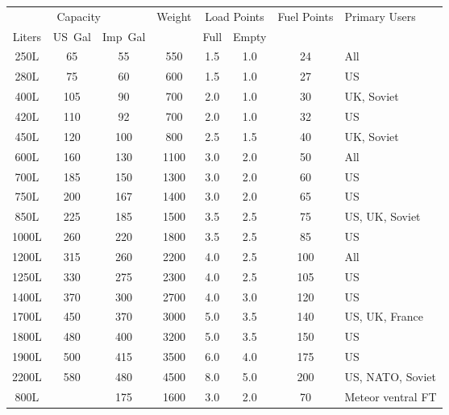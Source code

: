 \begin{twocolumntablefloat}
\begin{twocolumntable}
{
\begin{tabular}{cccccccl}
\toprule
\multicolumn{3}{c}{Capacity}&
Weight&
\multicolumn{2}{c}{Load Points}&
Fuel Points&
Primary Users\\
\cmidrule{1-3}
\cmidrule{5-6}
Liters&US~Gal&Imp~Gal&&Full&Empty&&\\
\midrule
\phantom{0}250L&\phantom{0}65&\phantom{0}55&\phantom{0}550&1.5&1.0&\phantom{0}24&All\\
\phantom{0}280L&\phantom{0}75&\phantom{0}60&\phantom{0}600&1.5&1.0&\phantom{0}27&US\\
\phantom{0}400L&\phantom{}105&\phantom{0}90&\phantom{0}700&2.0&1.0&\phantom{0}30&UK, Soviet\\
\phantom{0}420L&\phantom{}110&\phantom{0}92&\phantom{0}700&2.0&1.0&\phantom{0}32&US\\
\phantom{0}450L&\phantom{}120&\phantom{}100&\phantom{0}800&2.5&1.5&\phantom{0}40&UK, Soviet\\
\phantom{0}600L&\phantom{}160&\phantom{0}130&\phantom{}1100&3.0&2.0&\phantom{0}50&All\\
\phantom{0}700L&\phantom{}185&\phantom{0}150&\phantom{}1300&3.0&2.0&\phantom{0}60&US\\
\phantom{0}750L&\phantom{}200&\phantom{0}167&\phantom{}1400&3.0&2.0&\phantom{0}65&US\\
\phantom{0}850L&\phantom{}225&\phantom{0}185&\phantom{}1500&3.5&2.5&\phantom{0}75&US, UK, Soviet\\
\phantom{}1000L&\phantom{}260&\phantom{0}220&\phantom{}1800&3.5&2.5&\phantom{0}85&US\\
\phantom{}1200L&\phantom{}315&\phantom{0}260&\phantom{}2200&4.0&2.5&\phantom{}100&All\\
\phantom{}1250L&\phantom{}330&\phantom{0}275&\phantom{}2300&4.0&2.5&\phantom{}105&US\\
\phantom{}1400L&\phantom{}370&\phantom{0}300&\phantom{}2700&4.0&3.0&\phantom{}120&US\\
\phantom{}1700L&\phantom{}450&\phantom{0}370&\phantom{}3000&5.0&3.5&\phantom{}140&US, UK, France\\
\phantom{}1800L&\phantom{}480&\phantom{0}400&\phantom{}3200&5.0&3.5&\phantom{}150&US\\
\phantom{}1900L&\phantom{}500&\phantom{0}415&\phantom{}3500&6.0&4.0&\phantom{}175&US\\
\phantom{}2200L&\phantom{}580&\phantom{0}480&\phantom{}4500&8.0&5.0&\phantom{}200&US, NATO, Soviet\\
\midrule
\phantom{0}800L&\phantom{}&\phantom{0}175&\phantom{}1600&3.0&2.0&\phantom{0}70&Meteor ventral FT\\
\bottomrule
\end{tabular}

}
\end{twocolumntable}
\end{twocolumntablefloat}
